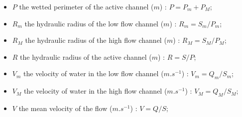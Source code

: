 \begin{itemize}
 \item $P$ the wetted perimeter of the active channel ($m$) : $P = P_m + P_M$;
\vspace{0.5cm}
 \item $R_m$ the hydraulic radius of the low flow channel ($m$) : $R_m = S_m / P_m$;
 \item $R_M$ the hydraulic radius of the high flow channel ($m$) : $R_M = S_M / P_M$;
 \item $R$ the hydraulic radius of the active channel ($m$) : $R = S / P$;
\vspace{0.5cm}
 \item $V_m$ the velocity of water in the low flow channel ($m.s^{-1}$) : $V_m = Q_m / S_m$;
 \item $V_M$ the velocity of water in the high flow channel ($m.s^{-1}$) : $V_M = Q_M / S_M$;
 \item $V$ the mean velocity of the flow ($m.s^{-1}$) : $V = Q / S$;
\end{itemize}

\vspace{0.5cm}
